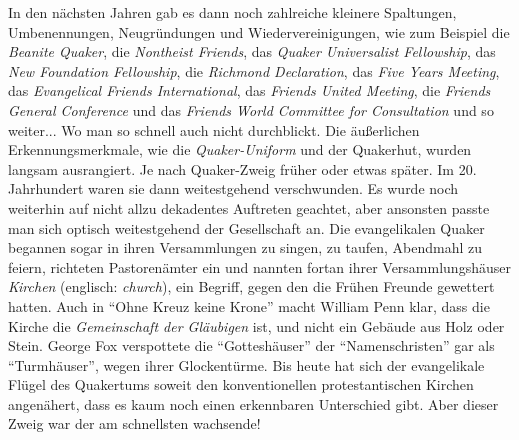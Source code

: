 In den nächsten Jahren gab es dann noch zahlreiche kleinere Spaltungen,
Umbenennungen, Neugründungen und Wiedervereinigungen, wie zum Beispiel die
\textit{Beanite Quaker}, die \textit{Nontheist
Friends}, das \textit{Quaker Universalist
Fellowship}, das \textit{New
Foundation Fellowship}, die
\textit{Richmond Declaration}, das \textit{Five
Years Meeting}, das \textit{Evangelical Friends International}, das \textit{Friends United
Meeting}, die \textit{Friends General
Conference} und das \textit{Friends
World Committee for Consultation} und so weiter... Wo man so schnell auch nicht
durchblickt.
Die äußerlichen Erkennungsmerkmale, wie die \textit{Quaker-Uniform} und der Quakerhut, wurden
langsam ausrangiert. Je nach Quaker-Zweig früher oder etwas später. Im 20.
Jahrhundert waren sie dann weitestgehend verschwunden. Es wurde noch weiterhin
auf
nicht allzu dekadentes Auftreten geachtet, aber ansonsten passte man sich
optisch weitestgehend der Gesellschaft an. Die evangelikalen Quaker begannen
sogar in ihren Versammlungen zu singen, zu taufen, Abendmahl zu feiern,
richteten Pastorenämter ein und nannten
fortan ihrer Versammlungshäuser \textit{Kirchen}
(englisch: \textit{church}),
ein Begriff, gegen den die Frühen Freunde gewettert hatten. Auch in "`Ohne Kreuz
keine Krone"' macht William Penn klar, dass die Kirche die \textit{Gemeinschaft
der
Gläubigen} ist, und nicht ein Gebäude aus Holz oder Stein. George Fox
verspottete
die "`Gotteshäuser"' der "`Namenschristen"' gar als
"`Turmhäuser"', wegen ihrer
Glockentürme. Bis heute hat sich der evangelikale Flügel des Quakertums soweit
den konventionellen protestantischen Kirchen angenähert, dass es kaum noch
einen
erkennbaren Unterschied gibt. Aber dieser Zweig war der am schnellsten
wachsende!

\medskip


